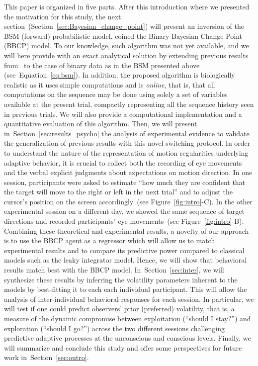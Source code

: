 \documentclass[10pt,letterpaper]{article}
\newcommand{\citet}[1]{\cite{#1}}
\newcommand{\seeFig}[1]{Figure~\ref{fig:#1}}
\newcommand{\seeEq}[1]{Equation~\ref{eq:#1}}
\newcommand{\seeSec}[1]{Section~\ref{sec:#1}}
\begin{document}
This paper is organized in five parts.
After this introduction where we presented the motivation for this study,
the next section~(\seeSec{Bayesian_change_point}) will present
an inversion of the BSM (forward) probabilistic model,
coined the Binary Bayesian Change Point (BBCP) model.
To our knowledge, such algorithm was not yet available, and
we will here provide with an exact analytical solution
by extending previous results from~\citet{AdamsMackay2007}
to the case of binary data as in the BSM presented above (see~\seeEq{bsm}).
In addition, the proposed algorithm is biologically realistic
as it uses simple computations and is \emph{online},
that is, that all computations on the sequence may be done
using solely a set of variables available at the present trial,
compactly representing all the sequence history seen in previous trials.
We will also provide a computational implementation
and a quantitative evaluation of this algorithm.
Then, we will present in~\seeSec{results_psycho} the analysis of experimental evidence
to validate the generalization of previous results %
with this novel switching protocol.
In order to understand the nature of
the representation of motion regularities underlying adaptive behavior,
it is crucial to collect both
the recording of eye movements
and the verbal explicit judgments about expectations on motion direction.
In one session, participants were asked to estimate
``how much they are confident that
the target will move to the right or left in the next trial'' and
to adjust the cursor's position on the screen accordingly~(see \seeFig{intro}-C).
In the other experimental session on a different day,
we showed the same sequence of target directions and
recorded participants' eye movements~(see \seeFig{intro}-B).
Combining these theoretical and experimental results,
a novelty of our approach is to use the BBCP agent as a regressor
which will allow us to match experimental results
and to compare its predictive power compared to classical models such as the leaky integrator model.
Hence, we will show that behavioral results match best with the BBCP model.
In~\seeSec{inter}, we will synthesize these results
by inferring the volatility parameters inherent to the models
by best-fitting it to each each individual participant.
This will allow the analysis of inter-individual behavioral responses for each session.
In particular, we will test if one could predict observers' prior (preferred) volatility,
that is, a measure of the dynamic compromise between
exploitation (``should I stay?'') and exploration (``should I go?'')
across the two different sessions challenging predictive adaptive processes
at the unconscious and conscious levels.
Finally, we will summarize and conclude this study and
offer some perspectives for future work in~\seeSec{outro}.
%
\end{document}
